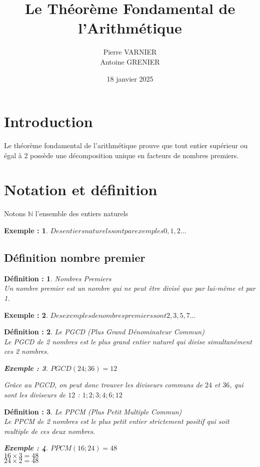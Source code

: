 \documentclass[titlepage]{article}
\title{Le Théorème Fondamental de l'Arithmétique}
\author{Pierre VARNIER \\ Antoine GRENIER}
\date{18 janvier 2025}
\newtheorem{exemple}{Exemple :}
\newtheorem{definiton}{Définition :}
\begin{document}
\maketitle
\tableofcontents
\newpage
\section{Introduction}

\hspace{1 cm} Le théorème fondamental de l'arithmétique prouve que tout entier supérieur ou égal à 2 possède une décomposition unique en facteurs de nombres premiers.

\section{Notation et définition}

\hspace{1 cm} Notons $\mathbb{N}$ l'ensemble des entiers naturels 
\begin{exemple}
$Des entiers naturels sont par exemples 0,1,2...$
\end{exemple}

\subsection{Définition nombre premier}

\begin{definiton}Nombres Premiers \\
Un nombre premier est un nombre qui ne peut être divisé que par lui-même et par 1.
\end{definiton}

\begin{exemple}
$Des exemples de nombres premiers sont 2,3,5,7...$
\end{exemple}

\begin{definiton}Le PGCD (Plus Grand Dénominateur Commun)\\
Le PGCD de 2 nombres est le plus grand entier naturel qui divise simultanément ces 2 nombres.

\begin{exemple}
$PGCD(24 ; 36) = 12 $
\end{exemple}
Grâce au PGCD, on peut donc trouver les diviseurs communs de $24$ et $36$, qui sont les diviseurs de $12$ : $1 ; 2 ; 3 ; 4 ; 6 ; 12$
\end{definiton}

\begin{definiton}Le PPCM (Plus Petit Multiple Commun)\\
Le PPCM de 2 nombres est le plus petit entier strictement positif qui soit multiple de ces deux nombres.

\begin{exemple}
$PPCM(16 ; 24) = 48$\\
$16 \times 3 = 48$	\\
$24 \times 2 = 48$ 	\\
\end{exemple}

\end{definiton}
\end{document}
